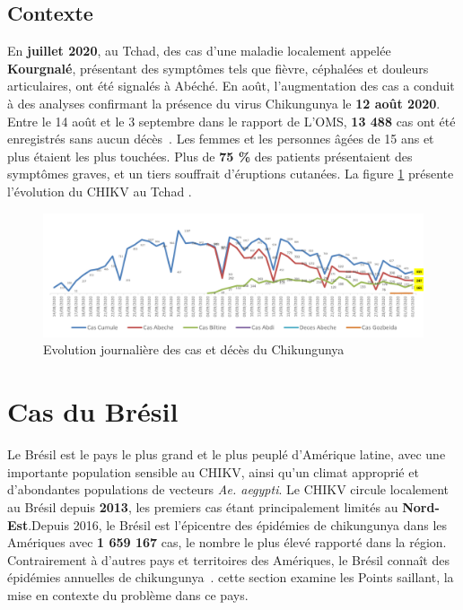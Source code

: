 \subsection{Contexte}
En \textbf{juillet 2020}, au Tchad, des cas d'une maladie localement appelée \textbf{Kourgnalé}, présentant des symptômes tels que fièvre, céphalées et douleurs articulaires, ont été signalés à Abéché. En août, l'augmentation des cas a conduit à des analyses confirmant la présence du virus Chikungunya le \textbf{12 août 2020}. Entre le 14 août et le 3 septembre dans le rapport de L'OMS, \textbf{13 488} cas ont été enregistrés sans aucun décès~\cite{rapport2020oms}. Les femmes et les personnes âgées de 15 ans et plus étaient les plus touchées. Plus de \textbf{75 \%} des patients présentaient des symptômes graves, et un tiers souffrait d'éruptions cutanées. La figure \ref{fig:cumulcaseschad} présente l'évolution du CHIKV au Tchad .
\begin{figure}[h!]
	\centering
	\includegraphics[width=0.9\linewidth]{images/cumul_cases_chad}
	\caption{ Evolution journalière des cas et décès du Chikungunya~\cite{rapport2020oms}}
	\label{fig:cumulcaseschad}
\end{figure}

\section{Cas du Brésil}
Le Brésil est le pays le plus grand et le plus peuplé d'Amérique latine, avec une importante population sensible au CHIKV, ainsi qu'un climat approprié et d'abondantes populations de vecteurs \textit{Ae. aegypti}. Le CHIKV circule localement au Brésil depuis \textbf{2013}, les premiers cas étant principalement limités au \textbf{Nord-Est}.Depuis 2016, le Brésil est l'épicentre des épidémies de chikungunya dans les Amériques avec \textbf{1 659 167} cas, le nombre le plus élevé rapporté dans la région. Contrairement à d'autres pays et territoires des Amériques, le Brésil connaît des épidémies annuelles de chikungunya~\cite{DESOUZA2024100673}.
cette section examine les Points saillant, la mise en contexte du problème dans ce pays.
